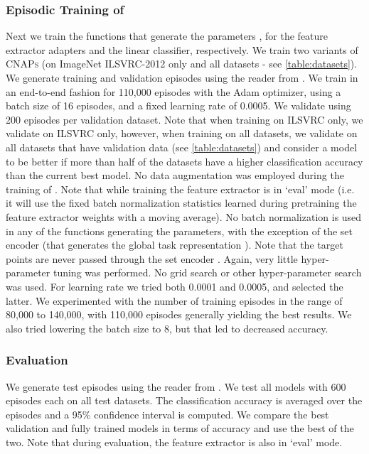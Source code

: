 \documentclass{article}
\theoremstyle{definition}
\newcommand{\cnaps}{\textsc{CNAPs}}
\begin{document}
\subsubsection{Episodic Training of \texorpdfstring{}{TEXT}}
\label{app:hypernet_meta_training}
Next we train the functions that generate the parameters ,  for the feature extractor adapters and the linear classifier, respectively. We train two variants of \cnaps{} (on ImageNet ILSVRC-2012 only and all datasets - see \cref{table:datasets}). We generate training and validation episodes using the reader from \citep{Triantafillou2019code}. We train in an end-to-end fashion for 110,000 episodes with the Adam \citep{kingma2014adam} optimizer, using a batch size of 16 episodes, and a fixed learning rate of 0.0005. We validate using 200 episodes per validation dataset. Note that when training on ILSVRC only, we validate on ILSVRC only, however, when training on all datasets, we validate on all datasets that have validation data (see \cref{table:datasets}) and consider a model to be better if more than half of the datasets have a higher classification accuracy than the current best model. No data augmentation was employed during the training of . Note that while training  the feature extractor  is in `eval' mode (i.e. it will use the fixed batch normalization statistics learned during pretraining the feature extractor weights  with a moving average). No batch normalization is used in any of the functions generating the  parameters, with the exception of the set encoder  (that generates the global task representation ). Note that the target points are never passed through the set encoder . Again, very little hyper-parameter tuning was performed. No grid search or other hyper-parameter search was used. For learning rate we tried both 0.0001 and 0.0005, and selected the latter. We experimented with the number of training episodes in the range of 80,000 to 140,000, with 110,000 episodes generally yielding the best results. We also tried lowering the batch size to 8, but that led to decreased accuracy.


\subsubsection{Evaluation}
\label{app:evaluation}
 We generate test episodes using the reader from \citep{Triantafillou2019code}. We test all models with 600 episodes each on all test datasets. The classification accuracy is averaged over the episodes and a 95\% confidence interval is computed. We compare the best validation and fully trained models in terms of accuracy and use the best of the two. Note that during evaluation, the feature extractor  is also in `eval' mode.
\end{document}
